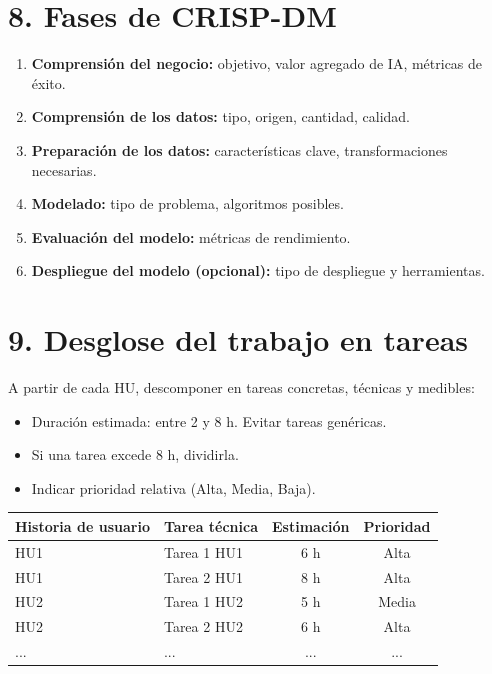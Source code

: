\documentclass[
11pt, %
]{charter}
\begin{document}
\section{8. Fases de CRISP-DM}

\begin{enumerate}
  \item \textbf{Comprensión del negocio:} objetivo, valor agregado de IA, métricas de éxito.
  \item \textbf{Comprensión de los datos:} tipo, origen, cantidad, calidad.
  \item \textbf{Preparación de los datos:} características clave, transformaciones necesarias.
  \item \textbf{Modelado:} tipo de problema, algoritmos posibles.
  \item \textbf{Evaluación del modelo:} métricas de rendimiento.
  \item \textbf{Despliegue del modelo (opcional):} tipo de despliegue y herramientas.
\end{enumerate}

\section{9. Desglose del trabajo en tareas}
\label{sec:wbs}

A partir de cada HU, descomponer en tareas concretas, técnicas y medibles:

\begin{itemize}
  \item Duración estimada: entre 2 y 8 h. Evitar tareas genéricas.
  \item Si una tarea excede 8 h, dividirla.
  \item Indicar prioridad relativa (Alta, Media, Baja).
\end{itemize}

\begin{table}[htpb]
\centering
\begin{tabularx}{\linewidth}{@{}|X|X|c|c|@{}}
\hline
\rowcolor[HTML]{C0C0C0}
Historia de usuario & Tarea técnica & Estimación & Prioridad \\ \hline
HU1 & Tarea 1 HU1 & 6 h & Alta \\ \hline
HU1 & Tarea 2 HU1 & 8 h & Alta \\ \hline
HU2 & Tarea 1 HU2 & 5 h & Media \\ \hline
HU2 & Tarea 2 HU2 & 6 h & Alta \\ \hline
... & ... & ... & ... \\ \hline
\end{tabularx}
\end{table}
\end{document}
